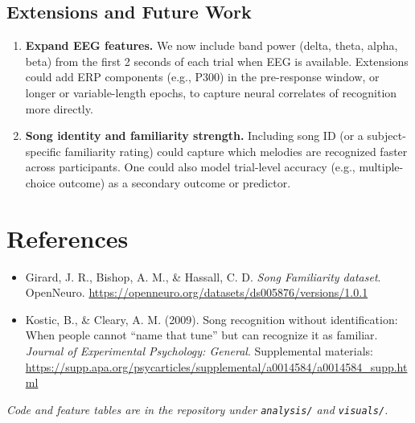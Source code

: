 \documentclass[11pt,a4paper]{article}
\begin{document}
\subsection{Extensions and Future Work}

\begin{enumerate}[leftmargin=*]
    \item \textbf{Expand EEG features.} We now include band power (delta, theta, alpha, beta) from the first 2 seconds of each trial when EEG is available. Extensions could add ERP components (e.g., P300) in the pre-response window, or longer or variable-length epochs, to capture neural correlates of recognition more directly.
    \item \textbf{Song identity and familiarity strength.} Including song ID (or a subject-specific familiarity rating) could capture which melodies are recognized faster across participants. One could also model trial-level accuracy (e.g., multiple-choice outcome) as a secondary outcome or predictor.
\end{enumerate}

\section{References}

\begin{itemize}[leftmargin=*]
    \item Girard, J. R., Bishop, A. M., \& Hassall, C. D. \emph{Song Familiarity dataset}. OpenNeuro. \url{https://openneuro.org/datasets/ds005876/versions/1.0.1}
    \item Kostic, B., \& Cleary, A. M. (2009). Song recognition without identification: When people cannot ``name that tune'' but can recognize it as familiar. \emph{Journal of Experimental Psychology: General}. Supplemental materials: \url{https://supp.apa.org/psycarticles/supplemental/a0014584/a0014584_supp.html}
\end{itemize}

\vspace{1em}
\noindent\emph{Code and feature tables are in the repository under \texttt{analysis/} and \texttt{visuals/}.}
\end{document}
